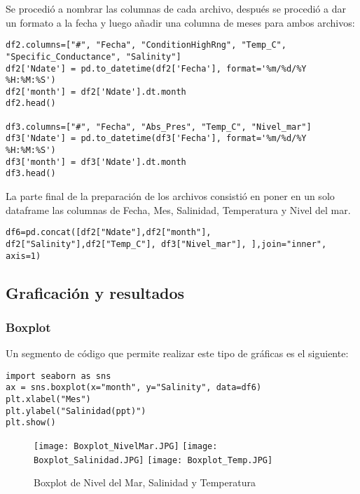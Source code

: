 \documentclass[a4paper]{article}
\begin{document}
Se procedió a nombrar las columnas de cada archivo, después se procedió a dar un formato a la fecha y luego añadir una columna de meses para ambos archivos:

\begin{verbatim}
df2.columns=["#", "Fecha", "ConditionHighRng", "Temp_C", "Specific_Conductance", "Salinity"]
df2['Ndate'] = pd.to_datetime(df2['Fecha'], format='%m/%d/%Y %H:%M:%S')
df2['month'] = df2['Ndate'].dt.month
df2.head()

df3.columns=["#", "Fecha", "Abs_Pres", "Temp_C", "Nivel_mar"]
df3['Ndate'] = pd.to_datetime(df3['Fecha'], format='%m/%d/%Y %H:%M:%S')
df3['month'] = df3['Ndate'].dt.month
df3.head()

\end{verbatim}

La parte final de la preparación de los archivos consistió en poner en un solo dataframe las columnas de Fecha, Mes, Salinidad, Temperatura y Nivel del mar.                                                                                                          

\begin{verbatim}
df6=pd.concat([df2["Ndate"],df2["month"], df2["Salinity"],df2["Temp_C"], df3["Nivel_mar"], ],join="inner", axis=1)
\end{verbatim}


\subsection{Graficación y resultados}

\subsubsection{Boxplot}

Un segmento de código que permite realizar este tipo de gráficas es el siguiente:

\begin{verbatim}
import seaborn as sns
ax = sns.boxplot(x="month", y="Salinity", data=df6)
plt.xlabel("Mes")
plt.ylabel("Salinidad(ppt)")
plt.show()
\end{verbatim}

\begin{figure}[h!]
\centering 
\texttt{[image: Boxplot\_NivelMar.JPG]}\label{fig:00Z}
\texttt{[image: Boxplot\_Salinidad.JPG]} 
\texttt{[image: Boxplot\_Temp.JPG]}
\caption{Boxplot de Nivel del Mar, Salinidad y Temperatura}
\end{figure}
\end{document}

